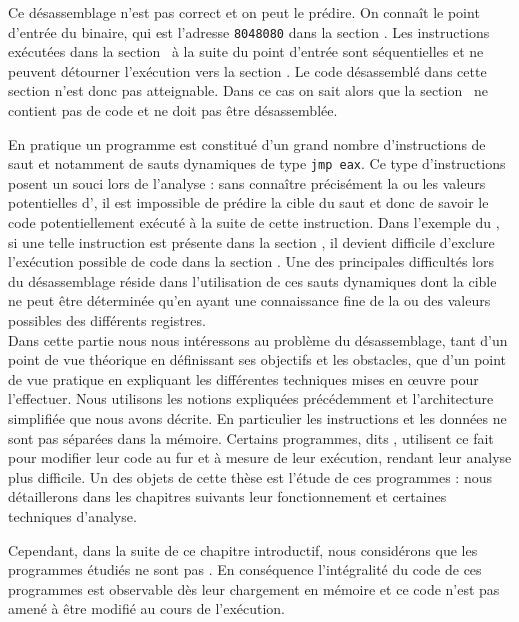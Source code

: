 Ce désassemblage n'est pas correct et on peut le prédire. 
On connaît le point d'entrée du binaire, qui est l'adresse \texttt{8048080} dans la section \ptext.
Les instructions exécutées dans la section \ptext\ à la suite du point d'entrée sont séquentielles et ne peuvent détourner l'exécution vers la section \pdata. 
Le code désassemblé dans cette section n'est donc pas atteignable. Dans ce cas on sait alors que la section \pdata\ ne contient pas de code et ne doit pas être désassemblée.



En pratique un programme est constitué d'un grand nombre d'instructions de saut et notamment de sauts dynamiques de type \texttt{jmp eax}.
Ce type d'instructions posent un souci lors de l'analyse : sans connaître précisément la ou les valeurs potentielles d'\eax, il est impossible de prédire la cible du saut et donc de savoir le code potentiellement exécuté à la suite de cette instruction.
Dans l'exemple du \helloworld, si une telle instruction est présente dans la section \ptext, il devient difficile d'exclure l'exécution possible de code dans la section \pdata.
Une des principales difficultés lors du désassemblage réside dans l'utilisation de ces sauts dynamiques dont la cible ne peut être déterminée qu'en ayant une connaissance fine de la ou des valeurs possibles des différents registres.
\\

Dans cette partie nous nous intéressons au problème du désassemblage, tant d'un point de vue théorique en définissant ses objectifs et les obstacles, que d'un point de vue pratique en expliquant les différentes techniques mises en \oe uvre pour l'effectuer.
Nous utilisons les notions expliquées précédemment et l'architecture simplifiée que nous avons décrite. En particulier les instructions et les données ne sont pas séparées dans la mémoire.
Certains programmes, dits \sms, utilisent ce fait pour modifier leur code au fur et à mesure de leur exécution, rendant leur analyse plus difficile. Un des objets de cette thèse est l'étude de ces programmes : nous détaillerons dans les chapitres suivants leur fonctionnement et certaines techniques d'analyse.

Cependant, dans la suite de ce chapitre introductif, nous considérons que les programmes étudiés ne sont pas \sms. En conséquence l'intégralité du code de ces programmes est observable dès leur chargement en mémoire et ce code n'est pas amené à être modifié au cours de l'exécution.

